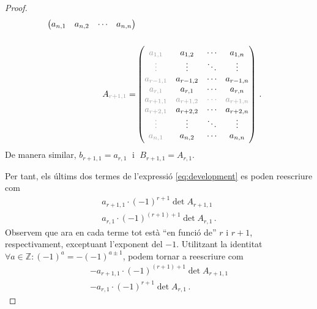 \begin{lema}
\begin{proof}
\begin{alignat*}{2}
\begin{pmatrix}
			a_{n,1}                     & a_{n,2}                    & \cdots                   & a_{n,n}                    \\
			\end{pmatrix}
			\\ \\
			A_{\color[gray]{0.6}r+1,1} = &
			\begin{pmatrix}
			\color[gray]{0.6}
			a_{1,1}                     & a_{1,2}                    & \cdots                   & a_{1,n}                    \\
			\color[gray]{0.6}
			\vdots                      & \vdots                     & \ddots                   & \vdots                     \\
			\color[gray]{0.6}
			a_{r-1,1}                   & a_{r-1,2}                  & \cdots                   & a_{r-1,n}                  \\
			\color[gray]{0.6}
			a_{r,1}                     & a_{r,1}                    & \cdots                   & a_{r,n}                    \\
			\color[gray]{0.6}	a_{r+1,1} & \color[gray]{0.6}a_{r+1,2} & \color[gray]{0.6}	\cdots & \color[gray]{0.6}a_{r+1,n} \\
			\color[gray]{0.6}
			a_{r+2,1}                   & a_{r+2,2}                  & \cdots                   & a_{r+2,n}                  \\
			\color[gray]{0.6}
			\vdots                      & \vdots                     & \ddots                   & \vdots                     \\
			\color[gray]{0.6}
			a_{n,1}                     & a_{n,2}                    & \cdots                   & a_{n,n}                    \\
			\end{pmatrix}\,.
		\end{alignat*}
		De manera similar, $b_{r+1, 1} = a_{r, 1}\;$ i $\;B_{r+1,1} = A_{r,1}$.
		
		Per tant, els últims dos termes de l'expressió \eqref{eq:development} es poden reescriure com
		\begin{equation*}\label{eq:penult}
			\begin{gathered}
				a_{r+1,1}\cdot(-1)^{r+1}\det A_{r+1,1}\\
				a_{r,1}\cdot(-1)^{(r+1)+1}\det A_{r,1}\,.
			\end{gathered}
		\end{equation*}
		Observem que ara en cada terme tot està ``en funció de'' $r$ i $r+1$, respectivament, exceptuant l'exponent del $-1$. Utilitzant la identitat $\forall a\in\mathbb{Z} : (-1)^a = -(-1)^{a\pm 1}$, podem tornar a reescriure com
		\begin{equation*}\label{eq:last}
			\begin{gathered}
				-a_{r+1,1}\cdot(-1)^{(r+1)+1}\det A_{r+1,1}\\
				-a_{r,1}\cdot(-1)^{r+1}\det A_{r,1}\,.
			\end{gathered}
		\end{equation*}
		

\end{proof}
\end{lema}
